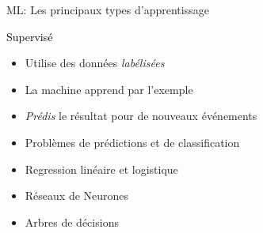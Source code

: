 \documentclass[aspectratio=169, 11pt]{beamer}
\begin{document}
\begin{frame}{ML: Les principaux types d'apprentissage}
  \begin{minipage}{.1\textwidth}
  \end{minipage}
  \hfill
  \begin{minipage}{.75\textwidth}
    \begin{beamerboxesrounded}[scheme=suppervise,lower=box,width=0.8\textwidth]{\textcolor{black}{Supervisé}}
      \begin{itemize}
        \scriptsize
      \item Utilise des données \textit{labélisées}
      \item La machine apprend par l'exemple
      \item \textit{Prédis} le résultat pour de nouveaux événements
      \item Problèmes de prédictions et de classification
      \item Regression linéaire et logistique
      \item Réseaux de Neurones
      \item Arbres de décisions
      \end{itemize}
    \end{beamerboxesrounded}
  \end{minipage}
  \hfill
  \begin{minipage}{.1\textwidth}
  \end{minipage}

  \vfill
  

\end{frame}
\end{document}
